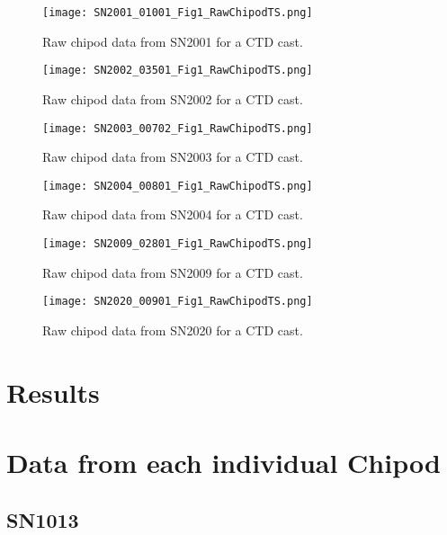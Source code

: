 \documentclass[11pt]{article}
\begin{document}
\begin{figure}[htbp]
\texttt{[image: SN2001\_01001\_Fig1\_RawChipodTS.png]}
\caption{Raw chipod data from SN2001 for a CTD cast.}
\label{sn2001_1}
\end{figure}

\begin{figure}[htbp]
\texttt{[image: SN2002\_03501\_Fig1\_RawChipodTS.png]}
\caption{Raw chipod data from SN2002 for a CTD cast.}
\label{sn2002_1}
\end{figure}

\begin{figure}[htbp]
\texttt{[image: SN2003\_00702\_Fig1\_RawChipodTS.png]}
\caption{Raw chipod data from SN2003 for a CTD cast.}
\label{sn2003_1}
\end{figure}

\begin{figure}[htbp]
\texttt{[image: SN2004\_00801\_Fig1\_RawChipodTS.png]}
\caption{Raw chipod data from SN2004 for a CTD cast.}
\label{sn2004_1}
\end{figure}

\begin{figure}[htbp]
\texttt{[image: SN2009\_02801\_Fig1\_RawChipodTS.png]}
\caption{Raw chipod data from SN2009 for a CTD cast.}
\label{sn2009_1}
\end{figure}

\begin{figure}[htbp]
\texttt{[image: SN2020\_00901\_Fig1\_RawChipodTS.png]}
\caption{Raw chipod data from SN2020 for a CTD cast.}
\label{sn2020_1}
\end{figure}






\newpage
\section{Results}





\clearpage
\section{Data from each individual Chipod}

\subsection{SN1013}
\end{document}
